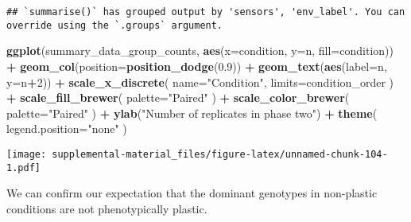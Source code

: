 \documentclass[]{book}
\newenvironment{Shaded}{\begin{snugshade}}{\end{snugshade}}
\newcommand{\DataTypeTok}[1]{\textcolor[rgb]{0.13,0.29,0.53}{#1}}
\newcommand{\DecValTok}[1]{\textcolor[rgb]{0.00,0.00,0.81}{#1}}
\newcommand{\FloatTok}[1]{\textcolor[rgb]{0.00,0.00,0.81}{#1}}
\newcommand{\KeywordTok}[1]{\textcolor[rgb]{0.13,0.29,0.53}{\textbf{#1}}}
\newcommand{\NormalTok}[1]{#1}
\newcommand{\OperatorTok}[1]{\textcolor[rgb]{0.81,0.36,0.00}{\textbf{#1}}}
\newcommand{\StringTok}[1]{\textcolor[rgb]{0.31,0.60,0.02}{#1}}
\begin{document}
\begin{verbatim}
## `summarise()` has grouped output by 'sensors', 'env_label'. You can override using the `.groups` argument.
\end{verbatim}

\begin{Shaded}
\begin{Highlighting}[]
\KeywordTok{ggplot}\NormalTok{(summary_data_group_counts, }\KeywordTok{aes}\NormalTok{(}\DataTypeTok{x=}\NormalTok{condition, }\DataTypeTok{y=}\NormalTok{n, }\DataTypeTok{fill=}\NormalTok{condition)) }\OperatorTok{+}
\StringTok{  }\KeywordTok{geom_col}\NormalTok{(}\DataTypeTok{position=}\KeywordTok{position_dodge}\NormalTok{(}\FloatTok{0.9}\NormalTok{)) }\OperatorTok{+}
\StringTok{  }\KeywordTok{geom_text}\NormalTok{(}\KeywordTok{aes}\NormalTok{(}\DataTypeTok{label=}\NormalTok{n, }\DataTypeTok{y=}\NormalTok{n}\OperatorTok{+}\DecValTok{2}\NormalTok{)) }\OperatorTok{+}
\StringTok{  }\KeywordTok{scale_x_discrete}\NormalTok{(}
    \DataTypeTok{name=}\StringTok{"Condition"}\NormalTok{,}
    \DataTypeTok{limits=}\NormalTok{condition_order}
\NormalTok{  ) }\OperatorTok{+}
\StringTok{  }\KeywordTok{scale_fill_brewer}\NormalTok{(}
    \DataTypeTok{palette=}\StringTok{"Paired"}
\NormalTok{  ) }\OperatorTok{+}
\StringTok{  }\KeywordTok{scale_color_brewer}\NormalTok{(}
    \DataTypeTok{palette=}\StringTok{"Paired"}
\NormalTok{  ) }\OperatorTok{+}
\StringTok{  }\KeywordTok{ylab}\NormalTok{(}\StringTok{"Number of replicates in phase two"}\NormalTok{) }\OperatorTok{+}
\StringTok{  }\KeywordTok{theme}\NormalTok{(}
    \DataTypeTok{legend.position=}\StringTok{"none"}
\NormalTok{  )}
\end{Highlighting}
\end{Shaded}

\texttt{[image: supplemental-material\_files/figure-latex/unnamed-chunk-104-1.pdf]}

We can confirm our expectation that the dominant genotypes in non-plastic conditions are not phenotypically plastic.
\end{document}
